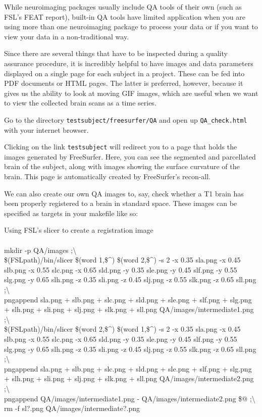 While neuroimaging packages usually include QA tools of their own (such as FSL's FEAT report), built-in QA tools have limited application when you are using more than one neuroimaging package to process your data or if you want to view your data in a non-traditional way.

Since there are several things that have to be inspected during a quality assurance procedure, it is incredibly helpful to have images and data parameters displayed on a single page for each subject in a project. These can be fed into PDF documents or HTML pages. The latter is preferred, however, because it gives us the ability to look at moving GIF images, which are useful when we want to view the collected brain scans as a time series. 

Go to the directory \texttt{testsubject/freesurfer/QA} and open up \texttt{QA_check.html} with your internet browser. 

Clicking on the link \texttt{testsubject} will redirect you to a page that holds the images generated by FreeSurfer. Here, you can see the segmented and parcellated brain of the subject, along with images showing the surface curvature of the brain. This page is automatically created by FreeSurfer's recon-all.

We can also create our own QA images to, say, check whether a T1 brain has been properly registered to a brain in standard space. These images can be specified as targets in your makefile like so: 
\clearpage
\begin{make}{Using FSL's slicer to create a registration image}{}
\\
 \\
	\tab mkdir -p QA/images ;\textbackslash{} \\
	\tab\$(FSLpath)/bin/slicer \$(word 1,\$\textasciicircum{}) \$(word 2,\$\textasciicircum{}) -s 2 -x 0.35 sla.png -x 0.45 slb.png -x 0.55 slc.png -x 0.65 sld.png -y 0.35 sle.png -y 0.45 slf.png -y 0.55 slg.png -y 0.65 slh.png -z 0.35 sli.png -z 0.45 slj.png -z 0.55 slk.png -z 0.65 sll.png ;\textbackslash{} \\
	\tab pngappend sla.png + slb.png + slc.png + sld.png + sle.png + slf.png + slg.png + slh.png + sli.png + slj.png + slk.png + sll.png QA/images/intermediate1.png ;\textbackslash{} \\
	\tab\$(FSLpath)/bin/slicer \$(word 2,\$\textasciicircum{}) \$(word 1,\$\textasciicircum{}) -s 2 -x 0.35 sla.png -x 0.45 slb.png -x 0.55 slc.png -x 0.65 sld.png -y 0.35 sle.png -y 0.45 slf.png -y 0.55 slg.png -y 0.65 slh.png -z 0.35 sli.png -z 0.45 slj.png -z 0.55 slk.png -z 0.65 sll.png ;\textbackslash{} \\
	\tab pngappend sla.png + slb.png + slc.png + sld.png + sle.png + slf.png + slg.png + slh.png + sli.png + slj.png + slk.png + sll.png QA/images/intermediate2.png ;\textbackslash{} \\
	\tab pngappend QA/images/intermediate1.png - QA/images/intermediate2.png \$@ ;\textbackslash{} \\
	\tab rm -f sl?.png QA/images/intermediate?.png
\end{make}

